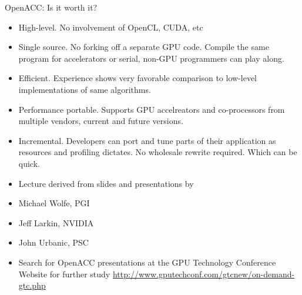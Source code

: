 \documentclass[c,mathserif,compress,xcolor=svgnames]{beamer}
\begin{document}
\begin{frame}{\small OpenACC: Is it worth it?}
  \begin{itemize}
    \item High-level. No involvement of OpenCL, CUDA, etc
    \item Single source. No forking off a separate GPU code. Compile the same program for accelerators or serial, non-GPU programmers can play along.
    \item Efficient. Experience shows very favorable comparison to low-level implementations of same algorithms.
    \item Performance portable. Supports GPU accelreators and co-processors from multiple vendors, current and future versions.
    \item Incremental. Developers can port and tune parts of their application as resources and profiling dictates. No wholesale rewrite required. Which can be quick.
  \end{itemize}
\end{frame}

\begin{frame}
  \begin{itemize}
    \item[] Lecture derived from slides and presentations by
    \item Michael Wolfe, PGI
    \item Jeff Larkin, NVIDIA
    \item John Urbanic, PSC
    \item[] Search for OpenACC presentations at the GPU Technology Conference Website for further study \url{http://www.gputechconf.com/gtcnew/on-demand-gtc.php}
  \end{itemize}
\end{frame}
\end{document}
